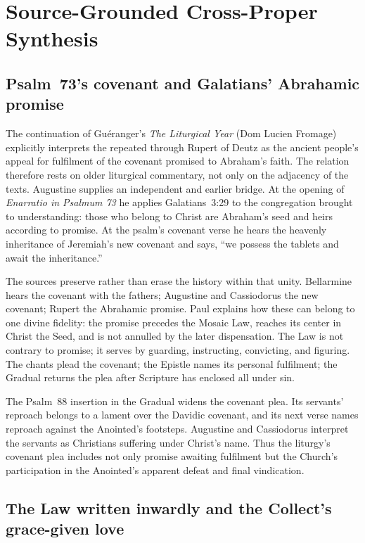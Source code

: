 \sectionguard
\section*{Source-Grounded Cross-Proper Synthesis}

\subsection*{Psalm~73's covenant and Galatians' Abrahamic promise\enspace
  }

The continuation of Guéranger's \emph{The Liturgical Year} (Dom Lucien Fromage)
explicitly interprets the repeated  through Rupert of
Deutz as the ancient people's appeal for fulfilment of the covenant promised to
Abraham's faith. The relation therefore rests on older liturgical commentary,
not only on the adjacency of the texts. Augustine supplies an independent and earlier bridge. At the
opening of \emph{Enarratio in Psalmum 73} he applies Galatians~3:29 to the
congregation brought to understanding: those who belong to Christ are
Abraham's seed and heirs according to promise. At the psalm's covenant verse he
hears the heavenly inheritance of Jeremiah's new covenant and says, ``we
possess the tablets and await the inheritance.''

The sources preserve rather than erase the history within that unity.
Bellarmine hears the covenant with the fathers; Augustine and Cassiodorus the
new covenant; Rupert the Abrahamic promise. Paul explains how these can belong
to one divine fidelity: the promise precedes the Mosaic Law, reaches its center
in Christ the Seed, and is not annulled by the later dispensation. The Law is
not contrary to promise; it serves by guarding, instructing, convicting, and
figuring. The chants plead the covenant; the Epistle names its personal
fulfilment; the Gradual returns the plea after Scripture has enclosed all under
sin.

The Psalm~88 insertion in the Gradual widens the covenant plea. Its
servants' reproach belongs to a lament over the Davidic covenant, and its next
verse names reproach against the Anointed's footsteps. Augustine and
Cassiodorus interpret the servants as Christians suffering under Christ's
name. Thus the liturgy's covenant plea includes not only promise awaiting
fulfilment but the Church's participation in the Anointed's apparent defeat
and final vindication.

\subsection*{The Law written inwardly and the Collect's grace-given love\enspace
  }

